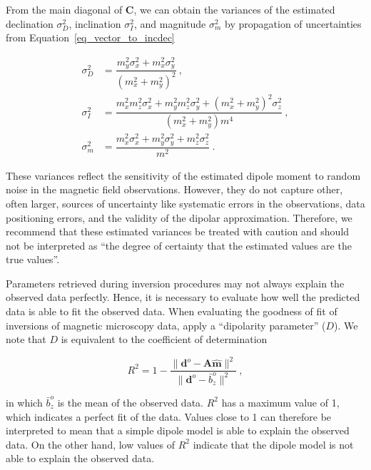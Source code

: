 \noindent
From the main diagonal of $\mathbf{C}$, we can obtain the variances of the
estimated declination $\sigma_D^2$, inclination $\sigma_I^2$, and magnitude $\sigma_m^2$
by propagation of uncertainties from Equation~\ref{eq_vector_to_incdec}

\begin{equation}
\label{eq_variances}
\begin{aligned}
\sigma_D^2 &= \dfrac{m_y^2\sigma_x^2 + m_x^2\sigma_y^2}{\left(m_x^2 + m_y^2\right)^2} \ , \\
\sigma_I^2 &= \dfrac{m_x^2 m_z^2 \sigma_x^2 + m_y^2 m_z^2 \sigma_y^2 + \left(m_x^2 + m_y^2\right)^2\sigma_z^2}{\left(m_x^2 + m_y^2\right) m^4} \ , \\
\sigma_m^2 &= \dfrac{m_x^2\sigma_x^2 + m_y^2\sigma_y^2 + m_z^2\sigma_z^2}{m^2} \ .
\end{aligned}
\end{equation}

\noindent
These variances reflect the sensitivity of the estimated dipole moment to random noise in the magnetic field observations. However, they do not capture other, often larger, sources of uncertainty like systematic errors in the observations, data positioning errors, and the validity of the dipolar approximation. Therefore, we recommend that these estimated variances be treated with caution and should not be interpreted as ``the degree of certainty that the estimated values are the true values''.

Parameters retrieved during inversion procedures may not always explain the observed data perfectly.
Hence, it is necessary to evaluate how well the predicted data is able to fit the observed data.
When evaluating the goodness of fit of inversions of magnetic microscopy data, \citet{Fu2020} apply a ``dipolarity parameter'' ($D$).
We note that $D$ is equivalent to the coefficient of determination

\begin{equation}
\label{eq_r2}
R^2 = 1 - \dfrac{\|\mathbf{d}^o - \mathbf{A}\hat{\mathbf{m}}\|^2}{\|\mathbf{d}^o - \bar{b}_z^o\|^2}\ ,
\end{equation}

\noindent
in which $\bar{b}_z^o$ is the mean of the observed data.
$R^2$ has a maximum value of 1, which indicates a perfect fit of the data.
Values close to 1 can therefore be interpreted to mean that a simple dipole model is able to explain the observed data.
On the other hand, low values of $R^2$ indicate that the dipole model is not able to explain the observed data.

